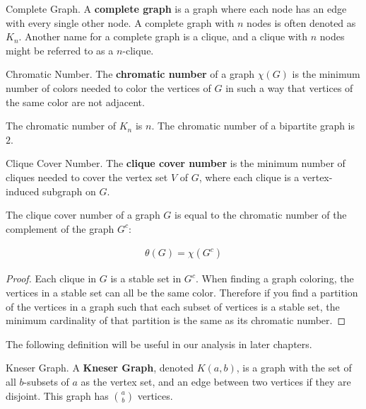 \begin{definition}{Complete Graph.}
    \label{defn:clique}
    A \textbf{complete graph} is a graph where each node has an edge with every single other node. A complete graph with $n$ nodes is often denoted as $K_n$. Another name for a complete graph is a clique, and a clique with $n$ nodes might be referred to as a $n$-clique.
\end{definition}

\begin{definition}{Chromatic Number.}
    \label{defn:colors}
	The \textbf{chromatic number} of a graph $\chi(G)$ is the minimum number of colors needed to color the vertices of $G$ in such a way that vertices of the same color are not adjacent.
\end{definition}

\begin{remark}
    The chromatic number of $K_n$ is $n$. The chromatic number of a bipartite graph is $2$.
\end{remark}

\begin{definition}{Clique Cover Number.}
    \label{defn:clique-cover-num}
    The \textbf{clique cover number} is the minimum number of cliques needed to cover the vertex set $V$ of $G$, where each clique is a vertex-induced subgraph on $G$.
\end{definition}

\begin{proposition}
    \label{prop:chrom-clique}
    The clique cover number of a graph $G$ is equal to the chromatic number of the complement of the graph $G^c$:
    
    \begin{align}
        \theta(G) = \chi(G^c)
    \end{align}
\end{proposition}

\begin{proof}
    Each clique in $G$ is a stable set in $G^c$. When finding a graph coloring, the vertices in a stable set can all be the same color. Therefore if you find a partition of the vertices in a graph such that each subset of vertices is a stable set, the minimum cardinality of that partition is the same as its chromatic number.
\end{proof}

The following definition will be useful in our analysis in later chapters.

\begin{definition}{Kneser Graph.}
    \label{defn:kneser-graph}
    A \textbf{Kneser Graph}, denoted $K(a,b)$, is a graph with the set of all $b$-subsets of $a$ as the vertex set, and an edge between two vertices if they are disjoint. This graph has $\binom{a}{b}$ vertices.  
\end{definition}

